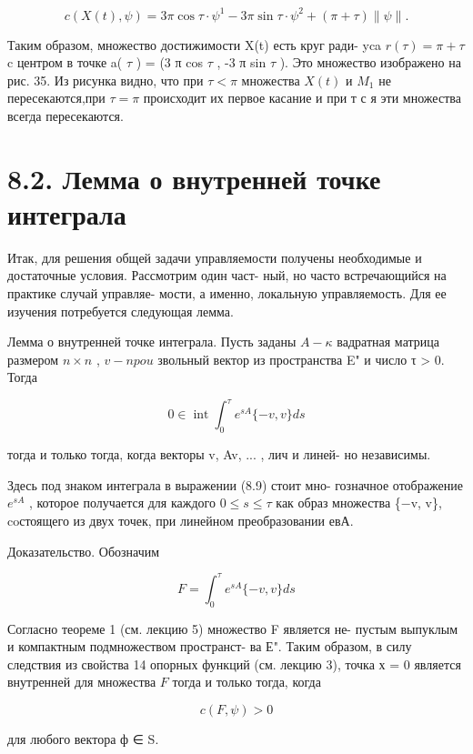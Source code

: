 \documentclass[8pt]{extarticle}
\begin{document}
\[
c\left( {X\left( t\right) ,\psi }\right)  = {3\pi }\cos \tau  \cdot  {\psi }^{1} - {3\pi }\sin \tau  \cdot  {\psi }^{2} + \left( {\pi  + \tau }\right) \parallel \psi \parallel .
\]

Таким образом, множество достижимости X(t) есть круг ради- yca \(r\left( \tau \right)  = \pi  + \tau\) c центром в точке a( \(\tau\) ) = (3 π cos \(\tau\) , -3 π sin \(\tau\) ). Это множество изображено на рис. 35. Из рисунка видно, что при \(\tau  < \pi\) множества \(X\left( t\right)\) и \({M}_{1}\) не пересекаются,при \(\tau  = \pi\) происходит их первое касание и при т с я эти множества всегда пересекаются.

\section*{8.2. Лемма о внутренней точке интеграла}

Итак, для решения общей задачи управляемости получены необходимые и достаточные условия. Рассмотрим один част- ный, но часто встречающийся на практике случай управляе- мости, а именно, локальную управляемость. Для ее изучения потребуется следующая лемма.

Лемма о внутренней точке интеграла. Пусть заданы \(A - \kappa\) вадратная матрица размером \(n \times  n\) , \(v - {npou}\) звольный вектор из пространства E" и число τ > 0. Тогда

\[
0 \in  \operatorname{int}{\int }_{0}^{\tau }{e}^{sA}\{  - v,v\} {ds} \tag{8.9}
\]

тогда и только тогда, когда векторы v, Av, ... , лич и линей- но независимы.

Здесь под знаком интеграла в выражении (8.9) стоит мно- гозначное отображение \({e}^{sA}\) , которое получается для каждого \(0 \leq  s \leq  \tau\) как образ множества \{−v, v\}, coстоящего из двух точек, при линейном преобразовании евА.

Доказательство. Обозначим

\[
F = {\int }_{0}^{\tau }{e}^{sA}\{  - v,v\} {ds}
\]

Согласно теореме 1 (см. лекцию 5) множество F является не- пустым выпуклым и компактным подмножеством пространст- ва Е". Таким образом, в силу следствия из свойства 14 опорных функций (см. лекцию 3), точка х = 0 является внутренней для множества \(F\) тогда и только тогда, когда

\[
c\left( {F,\psi }\right)  > 0
\]

для любого вектора ф ∈ S.
\end{document}
